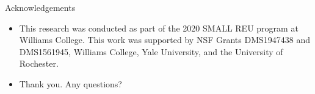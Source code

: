 \documentclass[handout]{beamer}
\newtheorem*{thm}{Theorem}
\begin{document}
\begin{frame}{Acknowledgements}
    \begin{itemize}
        \item This research was conducted as part of the 2020 SMALL REU program at Williams College. This work was supported by NSF Grants DMS1947438 and DMS1561945, Williams College, Yale University, and the University of Rochester.
        \pause
        \item Thank you. Any questions?
    \end{itemize}
\end{frame}
\begin{comment}
\begin{frame}{Legal Decompositions vs. Completeness}
    \begin{itemize}
        \item Previous work on PLRS relates to \emph{legal decompositions}, which are another way to write integers as sums of sequence terms.
        \item Given any PLRS, there is a legal decomposition of every positive integer. Does this mean that all PLRS are complete?
        \item No. For legal decompositions, sequence terms can be used more than once. This is not allowed for completeness decompositions.
    \end{itemize}
    
    
    \begin{example}
        The PLRS $[1,3]$ has terms $\{1, 2, 5, 11, \ldots\}$. The unique \emph{legal} decomposition for $9$ is $5 + 2(2)$, where the term $2$ is used twice. However, no \emph{complete} decomposition for $9$ exists.
    \end{example}
\end{frame}

\begin{frame}{Proof of Brown's Criterion}
    \begin{thm}[Brown]
	If $a_n$ is a nondecreasing sequence, then $a_n$ is complete if and only if $a_1 = 1$ and for all $n > 1$,
	\begin{equation}
	a_{n+1} \leq 1+ \sum_{i = 1}^{n} a_i. \nonumber
	\end{equation}
\end{thm}



\end{comment}
\end{document}
